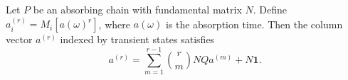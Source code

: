 Let $P$ be an absorbing chain with fundamental matrix $N$. Define $a_i^{(r)} = M_i[a(\omega)^r]$, where $a(\omega)$ is the absorption time. Then the column vector $a^{(r)}$ indexed by transient states satisfies
$$a^{(r)} = \sum_{m=1}^{r-1} \binom{r}{m} N Q a^{(m)} + N \mathbf{1}.$$
